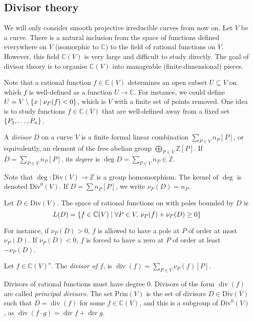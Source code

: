 \subsection{Divisor theory}
We will only consider smooth projective irreducible curves from now on.
Let \( V \) be a curve.
There is a natural inclusion from the space of functions defined everywhere on \( V \) (isomorphic to \( \mathbb C \)) to the field of rational functions on \( V \).
However, this field \( \mathbb C(V) \) is very large and difficult to study directly.
The goal of divisor theory is to organise \( \mathbb C(V) \) into manageable (finite-dimensional) pieces.

Note that a rational function \( f \in \mathbb C(V) \) determines an open subset \( U \subseteq V \) on which \( f \) is well-defined as a function \( U \to \mathbb C \).
For instance, we could define \( U = V \setminus \qty{x \mid \nu_P(f) < 0} \), which is \( V \) with a finite set of points removed.
One idea is to study functions \( f \in \mathbb C(V) \) that are well-defined away from a fixed set \( \qty{P_1, \dots, P_n} \).
\begin{definition}
    A \emph{divisor} \( D \) on a curve \( V \) is a finite formal linear combination \( \sum_{P \in V} n_P[P] \), or equivalently, an element of the free abelian group \( \bigoplus_{P \in V} \mathbb Z[P] \).
    If \( D = \sum_{P \in V} n_P [P] \), its \emph{degree} is \( \deg D = \sum_{P \in V} n_P \in \mathbb Z \).
\end{definition}
Note that \( \deg \colon \mathrm{Div}(V) \to \mathbb Z \) is a group homomorphism.
The kernel of \( \deg \) is denoted \( \mathrm{Div}^0(V) \).
If \( D = \sum n_P [P] \), we write \( \nu_P(D) = n_P \).
\begin{definition}
    Let \( D \in \mathrm{Div}(V) \).
    The space of rational functions on with poles bounded by \( D \) is
    \[ L(D) = \qty{f \in \mathbb C(V) \mid \forall P \in V,\, \nu_P(f) + \nu_P(D) \geq 0} \]
\end{definition}
For instance, if \( \nu_P(D) > 0 \), \( f \) is allowed to have a pole at \( P \) of order at most \( \nu_P(D) \).
If \( \nu_P(D) < 0 \), \( f \) is forced to have a zero at \( P \) of order at least \( -\nu_P(D) \).
\begin{definition}
    Let \( f \in \mathbb C(V)^\star \).
    The \emph{divisor of \( f \)}, is \( \operatorname{div}(f) = \sum_{P \in V} \nu_P(f)[P] \).
\end{definition}
Divisors of rational functions must have degree 0.
Divisors of the form \( \operatorname{div}(f) \) are called \emph{principal divisors}.
The set \( \mathrm{Prin}(V) \) is the set of divisors \( D \in \mathrm{Div}(V) \) such that \( D = \operatorname{div}(f) \) for some \( f \in \mathbb C(V) \), and this is a subgroup of \( \mathrm{Div}^0(V) \), as \( \operatorname{div}(f \cdot g) = \operatorname{div}f + \operatorname{div}g \).

